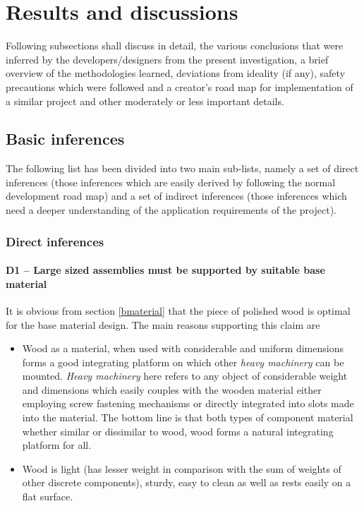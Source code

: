 \chapter{Results and discussions} \label{chapter6}

Following subsections shall discuss in detail, the various conclusions that were inferred by the developers/designers from the present investigation, a brief overview of the methodologies learned, deviations from ideality (if any), safety precautions which were followed and a creator’s road map for implementation of a similar project and other moderately or less important details.


\section{Basic inferences}

The following list has been divided into two main sub-lists, namely a set of direct inferences (those inferences which are easily derived by following the normal development road map) and a set of indirect inferences (those inferences which need a deeper understanding of the application requirements of the project).

\subsection{Direct inferences}

\subsubsection*{D1 – Large sized assemblies must be supported by suitable base material} \label{first_inf}

It is obvious from section \ref{bmaterial} that the piece of polished wood is optimal for the base material design. The main reasons supporting this claim are

\begin{itemize}
 \item Wood as a material, when used with considerable and uniform dimensions forms a good integrating platform on which other \textit{heavy machinery} can be mounted. \textit{Heavy machinery} here refers to any object of considerable weight and dimensions which easily couples with the wooden material either employing screw fastening mechanisms or directly integrated into slots made into the material. The bottom line is that both types of component material whether similar or dissimilar to wood, wood forms a natural integrating platform for all.
 \item Wood is light (has lesser weight in comparison with the sum of weights of other discrete components), sturdy, easy to clean as well as rests easily on a flat surface.
\end{itemize}


